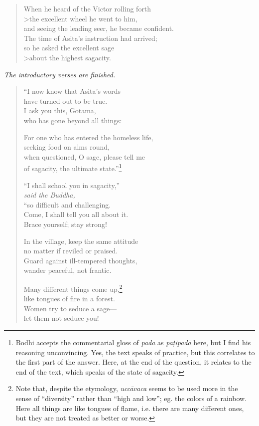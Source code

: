 \documentclass[12pt,openany]{book}%
\newcommand*{\scendsection}[1]{\begin{Center}\begin{small}\textit{#1}\end{small}\end{Center}\addvspace{1em}}
\newcommand*{\scspeaker}[1]{\hspace{2em}\textit{#1}}
\begin{document}
\begin{verse}
When he heard of the Victor rolling forth \\>the excellent wheel he went to him, \\
and seeing the leading seer, he became confident. \\
The time of Asita’s instruction had arrived; \\
so he asked the excellent sage \\>about the highest sagacity. 

%
\end{verse}

\scendsection{The introductory verses are finished. }

\begin{verse}%
“I now know that Asita’s words \\
have turned out to be true. \\
I ask you this, Gotama, \\
who has gone beyond all things: 

For one who has entered the homeless life, \\
seeking food on alms round, \\
when questioned, O sage, please tell me \\
of sagacity, the ultimate state.”\footnote{Bodhi accepts the commentarial gloss of \textit{pada} as \textit{\textsanskrit{paṭipadā}} here, but I find his reasoning unconvincing. Yes, the text speaks of practice, but this correlates to the first part of the answer. Here, at the end of the question, it relates to the end of the text, which speaks of the state of sagacity. } 

“I shall school you in sagacity,” \\
\scspeaker{said the Buddha, }\\
“so difficult and challenging. \\
Come, I shall tell you all about it. \\
Brace yourself; stay strong! 

In the village, keep the same attitude \\
no matter if reviled or praised. \\
Guard against ill-tempered thoughts, \\
wander peaceful, not frantic. 

Many different things come up,\footnote{Note that, despite the etymology, \textit{\textsanskrit{uccāvaca}} seems to be used more in the sense of “diversity” rather than “high and low”; eg. the colors of a rainbow. Here all things are like tongues of flame, i.e. there are many different ones, but they are not treated as better or worse. } \\
like tongues of fire in a forest. \\
Women try to seduce a sage—\\
let them not seduce you! 


\end{verse}
\end{document}
